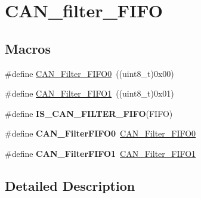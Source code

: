 \hypertarget{group___c_a_n__filter___f_i_f_o}{\section{C\-A\-N\-\_\-filter\-\_\-\-F\-I\-F\-O}
\label{group___c_a_n__filter___f_i_f_o}
}
\subsection*{Macros}
\begin{DoxyCompactItemize}
\item 
\#define \hyperlink{group___c_a_n__filter___f_i_f_o_ga8249c27978ca94676530540b88a6be8f}{C\-A\-N\-\_\-\-Filter\-\_\-\-F\-I\-F\-O0}~((uint8\-\_\-t)0x00)
\item 
\#define \hyperlink{group___c_a_n__filter___f_i_f_o_gaab8478c89a607c4b8baf68efc730e316}{C\-A\-N\-\_\-\-Filter\-\_\-\-F\-I\-F\-O1}~((uint8\-\_\-t)0x01)
\item 
\#define {\bfseries I\-S\-\_\-\-C\-A\-N\-\_\-\-F\-I\-L\-T\-E\-R\-\_\-\-F\-I\-F\-O}(F\-I\-F\-O)
\item 
\hypertarget{group___c_a_n__filter___f_i_f_o_ga1b3d041dff9fed4dad75ed2a4a0e27e0}{\#define {\bfseries C\-A\-N\-\_\-\-Filter\-F\-I\-F\-O0}~\hyperlink{group___c_a_n__filter___f_i_f_o_ga8249c27978ca94676530540b88a6be8f}{C\-A\-N\-\_\-\-Filter\-\_\-\-F\-I\-F\-O0}}\label{group___c_a_n__filter___f_i_f_o_ga1b3d041dff9fed4dad75ed2a4a0e27e0}

\item 
\hypertarget{group___c_a_n__filter___f_i_f_o_gada8f9b3a9c88f36539aaeb457039e666}{\#define {\bfseries C\-A\-N\-\_\-\-Filter\-F\-I\-F\-O1}~\hyperlink{group___c_a_n__filter___f_i_f_o_gaab8478c89a607c4b8baf68efc730e316}{C\-A\-N\-\_\-\-Filter\-\_\-\-F\-I\-F\-O1}}\label{group___c_a_n__filter___f_i_f_o_gada8f9b3a9c88f36539aaeb457039e666}

\end{DoxyCompactItemize}


\subsection{Detailed Description}


